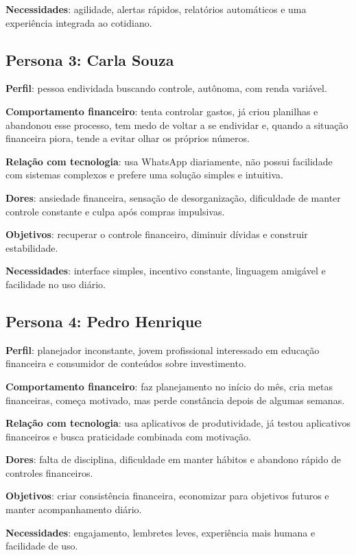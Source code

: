 \textbf{Necessidades}: agilidade, alertas rápidos, relatórios automáticos e uma experiência integrada ao cotidiano.

\subsection{Persona 3: Carla Souza}

\textbf{Perfil}: pessoa endividada buscando controle, autônoma, com renda variável.

\textbf{Comportamento financeiro}: tenta controlar gastos, já criou planilhas e abandonou esse processo, tem medo de voltar a se endividar e, quando a situação financeira piora, tende a evitar olhar os próprios números.

\textbf{Relação com tecnologia}: usa WhatsApp diariamente, não possui facilidade com sistemas complexos e prefere uma solução simples e intuitiva.

\textbf{Dores}: ansiedade financeira, sensação de desorganização, dificuldade de manter controle constante e culpa após compras impulsivas.

\textbf{Objetivos}: recuperar o controle financeiro, diminuir dívidas e construir estabilidade.

\textbf{Necessidades}: interface simples, incentivo constante, linguagem amigável e facilidade no uso diário.

\subsection{Persona 4: Pedro Henrique}

\textbf{Perfil}: planejador inconstante, jovem profissional interessado em educação financeira e consumidor de conteúdos sobre investimento.

\textbf{Comportamento financeiro}: faz planejamento no início do mês, cria metas financeiras, começa motivado, mas perde constância depois de algumas semanas.

\textbf{Relação com tecnologia}: usa aplicativos de produtividade, já testou aplicativos financeiros e busca praticidade combinada com motivação.

\textbf{Dores}: falta de disciplina, dificuldade em manter hábitos e abandono rápido de controles financeiros.

\textbf{Objetivos}: criar consistência financeira, economizar para objetivos futuros e manter acompanhamento diário.

\textbf{Necessidades}: engajamento, lembretes leves, experiência mais humana e facilidade de uso.

